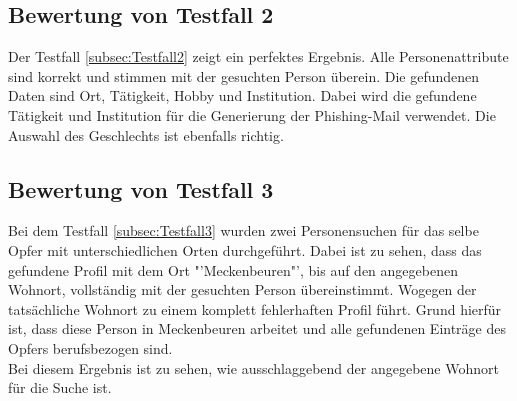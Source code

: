	\subsection{Bewertung von Testfall 2}
	Der Testfall \ref{subsec:Testfall2} zeigt ein perfektes Ergebnis. Alle Personenattribute sind korrekt und stimmen mit der gesuchten Person überein. Die gefundenen Daten sind Ort, Tätigkeit, Hobby und Institution. Dabei wird die gefundene Tätigkeit und Institution für die Generierung der Phishing-Mail verwendet. Die Auswahl des Geschlechts ist ebenfalls richtig.
	\subsection{Bewertung von Testfall 3}
	Bei dem Testfall \ref{subsec:Testfall3} wurden zwei Personensuchen für das selbe Opfer mit unterschiedlichen Orten durchgeführt. Dabei ist zu sehen, dass das gefundene Profil mit dem Ort "'Meckenbeuren"', bis auf den angegebenen Wohnort, vollständig mit der gesuchten Person übereinstimmt. Wogegen der tatsächliche Wohnort zu einem komplett fehlerhaften Profil führt. Grund hierfür ist, dass diese Person in Meckenbeuren arbeitet und alle gefundenen Einträge des Opfers berufsbezogen sind.\\
	Bei diesem Ergebnis ist zu sehen, wie ausschlaggebend der angegebene Wohnort für die Suche ist.
